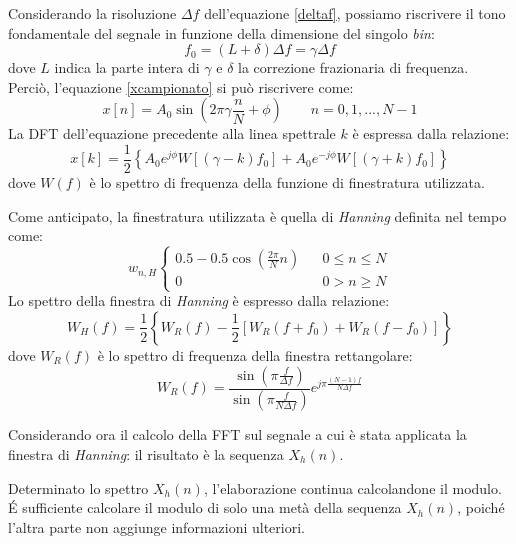 Considerando la risoluzione $\Delta f $ dell'equazione \ref{deltaf}, possiamo riscrivere il tono fondamentale del segnale in funzione della dimensione del singolo \textit{bin}:
\begin{equation}
	f_0 = (L+\delta)\Delta f = \gamma \Delta f
\end{equation}
dove $L$ indica la parte intera di $\gamma$ e $\delta$ la correzione frazionaria di frequenza. Perciò, l'equazione \ref{xcampionato} si può riscrivere come:
\begin{equation}
	x[n]=A_0 \sin ( 2 \pi \gamma \frac{n}{N} + \phi ) \qquad n=0,1,...,N-1
\end{equation}
La DFT dell'equazione precedente alla linea spettrale $k$ è espressa dalla relazione:
\begin{equation}
	x[k] = \frac{1}{2} \left \{ A_0 e^{j\phi} W[(\gamma -k)f_0] + A_0 e^{-j\phi}W[(\gamma + k)f_0]  \right \}
\end{equation}
dove $W(f)$ è lo spettro di frequenza della funzione di finestratura utilizzata.

Come anticipato, la finestratura utilizzata è quella di \textit{Hanning} definita nel tempo come:	
\begin{equation}
w_{n,H}
\left\{\begin{matrix}
0.5 - 0.5\cos \left ( \frac{2 \pi}{N}n \right ) & & 0 \leq n \leq N \\ 
 0  &  & 0 > n \geq N
\end{matrix}\right.
\end{equation}
Lo spettro della finestra di \textit{Hanning} è espresso dalla relazione:
\begin{equation}
	W_H(f) = \frac{1}{2} \left \{ W_R (f) - \frac{1}{2} \left [ W_R (f+f_0) + W_R (f-f_0) \right ] \right \}
\end{equation}
dove $W_R (f)$ è lo spettro di frequenza della finestra rettangolare:
\begin{equation}
	W_R (f) = \frac{ \sin \left ( \pi \frac{f}{\Delta f} \right ) }{ \sin \left ( \pi \frac{f}{N \Delta f} \right ) } e^ { j \pi \frac{(N-1) f}{N \Delta f} }
\end{equation}

Considerando ora il calcolo della FFT sul segnale a cui è stata applicata la finestra di \textit{Hanning}: il risultato è la sequenza $X_h(n)$.

Determinato lo spettro $X_h(n)$, l'elaborazione continua calcolandone il modulo. \'E sufficiente calcolare il modulo di solo una metà della sequenza $X_h(n)$, poiché l'altra parte non aggiunge informazioni ulteriori.

